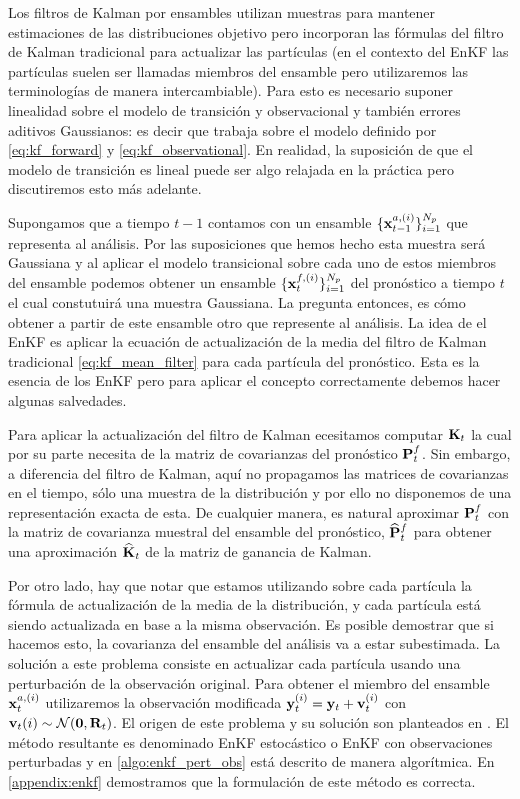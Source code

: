 Los filtros de Kalman por ensambles utilizan muestras para mantener estimaciones de las distribuciones objetivo pero incorporan las fórmulas del filtro de Kalman tradicional para actualizar las partículas (en el contexto del EnKF las partículas suelen ser llamadas miembros del ensamble pero utilizaremos las terminologías de manera intercambiable). Para esto es necesario suponer linealidad sobre el modelo de transición y observacional y también errores aditivos Gaussianos: es decir que trabaja sobre el modelo definido por \ref{eq:kf_forward} y \ref{eq:kf_observational}. En realidad, la suposición de que el modelo de transición es lineal puede ser algo relajada en la práctica pero discutiremos esto más adelante.

Supongamos que a tiempo $t-1$ contamos con un ensamble $\{ \mathbf{x}_{t-1}^{a, (i)} \}_{i=1}^{N_p}$ que representa al análisis. Por las suposiciones que hemos hecho esta muestra será Gaussiana y al aplicar el modelo transicional sobre cada uno de estos miembros del ensamble podemos obtener un ensamble $\{ \mathbf{x}_{t}^{f, (i)} \}_{i=1}^{N_p}$ del pronóstico a tiempo $t$ el cual constutuirá una muestra Gaussiana. La pregunta entonces, es cómo obtener a partir de este ensamble otro que represente al análisis. La idea de el EnKF es aplicar la ecuación de actualización de la media del filtro de Kalman tradicional \ref{eq:kf_mean_filter} para cada partícula del pronóstico. Esta es la esencia de los EnKF pero para aplicar el concepto correctamente debemos hacer algunas salvedades.

Para aplicar la actualización del filtro de Kalman ecesitamos computar $\mathbf{K}_t$ la cual por su parte necesita de la matriz de covarianzas del pronóstico $\mathbf{P}_t^f$. Sin embargo, a diferencia del filtro de Kalman, aquí no propagamos las matrices de covarianzas en el tiempo, sólo una muestra de la distribución y por ello no disponemos de una representación exacta de esta. De cualquier manera, es natural aproximar $\mathbf{P}_t^f$ con la matriz de covarianza muestral del ensamble del pronóstico, $\widehat{\mathbf{P}}_t^f$ para obtener una aproximación $\widehat{\mathbf{K}}_t$ de la matriz de ganancia de Kalman.

Por otro lado, hay que notar que estamos utilizando sobre cada partícula la fórmula de actualización de la media de la distribución, y cada partícula está siendo actualizada en base a la misma observación. Es posible demostrar que si hacemos esto, la covarianza del ensamble del análisis va a estar subestimada. La solución a este problema consiste en actualizar cada partícula usando una perturbación de la observación original. Para obtener el miembro del ensamble $\mathbf{x}_t^{a, (i)}$ utilizaremos la observación modificada $\mathbf{y}_t^{(i)} = \mathbf{y}_t + \mathbf{v}_t^{(i)}$ con $\mathbf{v}_t{(i)} \sim \mathcal{N}(\mathbf{0}, \mathbf{R}_t)$. El origen de este problema y su solución son planteados en \cite{Burgers1998}. El método resultante es denominado EnKF estocástico o EnKF con observaciones perturbadas y en \ref{algo:enkf_pert_obs} está descrito de manera algorítmica. En \ref{appendix:enkf} demostramos que la formulación de este método es correcta.

